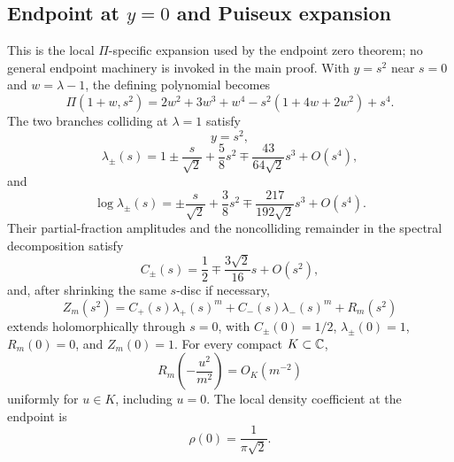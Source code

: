 \subsection{Endpoint at \texorpdfstring{$y=0$}{y=0} and Puiseux expansion}\label{subsec:endpoint-puiseux}

\begin{proposition}[Endpoint Puiseux expansion at $y=0$]\label{prop:endpoint-puiseux}\label{prop:endpoint-main-local-package}
This is the local $\Pi$-specific expansion used by the endpoint zero theorem; no general endpoint machinery is invoked in the main proof.  With $y=s^2$ near $s=0$ and $w=\lambda-1$, the defining polynomial becomes
\begin{equation}\label{eq:endpoint-recursive-polynomial-main}
\Pi(1+w,s^2)=2w^2+3w^3+w^4-s^2(1+4w+2w^2)+s^4.
\end{equation}
The two branches colliding at $\lambda=1$ satisfy
\begin{equation}\label{eq:y-puiseux}
y=s^2,
\end{equation}
\begin{equation}\label{eq:lambda-puiseux}
\lambda_\pm(s)=1\pm\frac{s}{\sqrt2}+\frac58s^2\mp\frac{43}{64\sqrt2}s^3+O(s^4),
\end{equation}
and
\begin{equation}\label{eq:f-puiseux}
\log\lambda_\pm(s)=\pm\frac{s}{\sqrt2}+\frac38s^2\mp\frac{217}{192\sqrt2}s^3+O(s^4).
\end{equation}
Their partial-fraction amplitudes and the noncolliding remainder in the spectral decomposition satisfy
\begin{equation}\label{eq:endpoint-amplitudes-main-package}
C_\pm(s)=\frac12\mp\frac{3\sqrt2}{16}s+O(s^2),
\end{equation}
and, after shrinking the same $s$-disc if necessary,
\begin{equation}\label{eq:removable-endpoint-spectral-decomposition-main}
Z_m(s^2)=C_+(s)\lambda_+(s)^m+C_-(s)\lambda_-(s)^m+R_m(s^2)
\end{equation}
extends holomorphically through $s=0$, with $C_\pm(0)=1/2$, $\lambda_\pm(0)=1$, $R_m(0)=0$, and $Z_m(0)=1$.  For every compact $K\subset\mathbb{C}$,
\begin{equation}\label{eq:endpoint-remainder-main-package}
R_m\!\left(-\frac{u^2}{m^2}\right)=O_K(m^{-2})
\end{equation}
uniformly for $u\in K$, including $u=0$.
The local density coefficient at the endpoint is
\begin{equation}\label{eq:rho-endpoint}
\rho(0)=\frac1{\pi\sqrt2}.
\end{equation}
\end{proposition}
